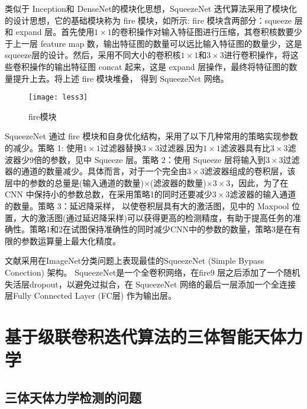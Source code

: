 \documentclass{dmuthesis}
\begin{document}
类似于 Inception和 DenseNet的模块化思想，SqueezeNet 迭代算法采用了模块化的设计思想，它的基础模块称为 f\/ire 模块，如所示:  f\/ire 模块含两部分：squeeze 层和 expand 层。首先使用$1\times1$的卷积操作对输入特征图进行压缩，其卷积核数要少于上一层 feature map 数，输出特征图的数量可以远比输入特征图的数量少，这是 squeeze层的设计。然后，采用不同大小的卷积核$1\times1$和$3\times3$进行卷积操作，将这些卷积操作的输出特征图 concat 起来，这是 expand 层操作，最终将特征图的数量提升上去。将上述 f\/ire 模块堆叠， 得到 SqueezeNet 网络。

\begin{figure}[!htbp]
	\centering
	\texttt{[image: less3]}
	\caption{f\/ire模块}
     \label{figfire}
\end{figure}

SqueezeNet 通过 f\/ire 模块和自身优化结构，采用了以下几种常用的策略实现参数的减少。策略 1: 使用$1\times1$过滤器替换$3\times3$过滤器,因为$1\times1$滤波器具有比$3\times3$滤波器少9倍的参数，见中 Squeeze 层。策略 2：使用 Squeeze 层将输入到$3\times3$过滤器的通道的数量减少。具体而言，对于一个完全由$3\times3$滤波器组成的卷积层，该层中的参数的总量是(输入通道的数量)$\times$(滤波器的数量)$\times3\times3$，因此，为了在 CNN 中保持小的参数总数，在采用策略1的同时还要减少$3\times3$滤波器的输入通道的数量。策略 3：延迟降采样， 以使卷积层具有大的激活图，见中的 Maxpool 位置，大的激活图(通过延迟降采样)可以获得更高的检测精度，有助于提高任务的准确性。策略1和2在试图保持准确性的同时减少CNN中的参数的数量，策略3是在有限的参数运算量上最大化精度。 

文献\cite{bib:one}采用在ImageNet分类问题上表现最佳的SqueezeNet (Simple Bypass  Conection) 架构。 SqueezeNet是一个全卷积网络，在f\/ire9 层之后添加了一个随机失活层dropout，以避免过拟合，在 SqueezeNet 网络的最后一层添加一个全连接层Fully Connected Layer (FC层) 作为输出层。

\section{基于级联卷积迭代算法的三体智能天体力学}

\subsection{三体天体力学检测的问题}
\end{document}
